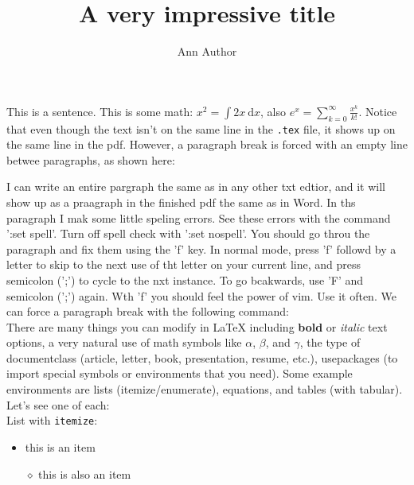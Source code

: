 \documentclass{article}
\title{A very impressive title}
\author{Ann Author}
\begin{document}
\maketitle

This is a sentence. This is some math:
$x^2 = \int 2x \ \text{d}x$,
also 
$e^x = \sum_{k=0}^\infty \frac{x^k}{k!}$.
Notice that even though the text
isn't on the same line in the \texttt{.tex} file, it shows up on the same line
in the pdf. However, a paragraph break is forced with an empty line betwee
paragraphs, as shown here:

I can write an entire pargraph the same as in any other txt edtior, and it will
show up as a praagraph in the finished pdf the same as in Word. In ths
paragraph I mak some little speling errors. See these errors with the command
':set spell'. Turn off spell check with ':set nospell'.  You should go throu
the paragraph and fix them using the 'f' key. In normal mode, press 'f' followd
by a letter to skip to the next use of tht letter on your current line, and
press semicolon (';') to cycle to the nxt instance. To go bcakwards, use 'F'
and semicolon (';') again. Wth 'f' you should feel the power of vim. Use it
often. We can force a paragraph break with the following command:
\\ %

There are many things you can modify in LaTeX including \textbf{bold} or
\textit{italic} text options, a very natural use of math symbols like $\alpha$,
$\beta$, and $\gamma$, the type of documentclass (article, letter, book,
presentation, resume, etc.), usepackages (to import special symbols or
environments that you need). Some example environments are lists
(itemize/enumerate), equations, and tables
(with tabular). Let's see one of each: \\

List with \texttt{itemize}:
\begin{itemize}
    \item this is an item
    \item[$\diamond$] this is also an item
\end{itemize}
\end{document}
